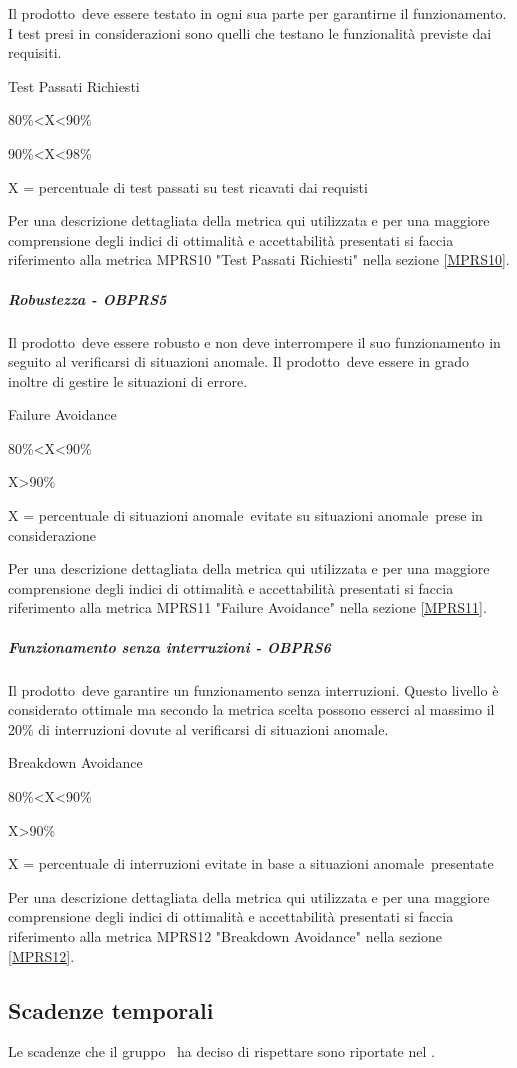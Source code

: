 \documentclass[../PianoDiQualifica.tex]{subfiles}
\begin{document}
				Il prodotto\g\ deve essere testato in ogni sua parte per garantirne il funzionamento. I test presi in considerazioni sono quelli che testano le funzionalità previste dai requisiti. 
					\begin{description}
						\item [Metrica utilizzata:] Test Passati Richiesti
						\item [Soglia di accettabilità:] 80\%<X<90\%
						\item [Soglia di ottimalità:] 90\%<X<98\%
						\item X = percentuale di test passati su test ricavati dai requisti
					\end{description}
			    Per una descrizione dettagliata della metrica qui utilizzata e per una maggiore comprensione degli indici di ottimalità e accettabilità presentati si faccia riferimento alla metrica MPRS10 "Test Passati Richiesti" nella sezione \ref{MPRS10}.
				\subparagraph{Robustezza -  OBPRS5}	
				Il prodotto\g\ deve essere robusto e non deve interrompere il suo funzionamento in seguito al verificarsi di situazioni anomale\g. Il prodotto\g\ deve essere in grado inoltre di gestire le situazioni di errore.
					\begin{description}
						\item [Metrica utilizzata:] Failure Avoidance
						\item [Soglia di accettabilità:] 80\%<X<90\%
						\item [Soglia di ottimalità:] X>90\%
						\item X = percentuale di situazioni anomale\g\ evitate su situazioni anomale\g\ prese in considerazione
					\end{description}
					Per una descrizione dettagliata della metrica qui utilizzata e per una maggiore comprensione degli indici di ottimalità e accettabilità presentati si faccia riferimento alla metrica MPRS11 "Failure Avoidance" nella sezione \ref{MPRS11}.
				\subparagraph{Funzionamento senza interruzioni - OBPRS6}
					Il prodotto\g\ deve garantire un funzionamento senza interruzioni. Questo livello è considerato ottimale ma secondo la metrica scelta possono esserci al massimo il 20\% di interruzioni dovute al verificarsi di situazioni anomale\g.  
					\begin{description}
						\item [Metrica utilizzata:] Breakdown Avoidance
						\item [Soglia di accettabilità:] 80\%<X<90\%
						\item [Soglia di ottimalità:] X>90\%
						\item X = percentuale di interruzioni evitate in base a situazioni anomale\g\ presentate
					\end{description}
					Per una descrizione dettagliata della metrica qui utilizzata e per una maggiore comprensione degli indici di ottimalità e accettabilità presentati si faccia riferimento alla metrica MPRS12 "Breakdown Avoidance" nella sezione \ref{MPRS12}.
	\subsection{Scadenze temporali}
	Le scadenze che il gruppo \leaf\ ha deciso di rispettare sono riportate nel \pianodiprogettov.
\end{document}
